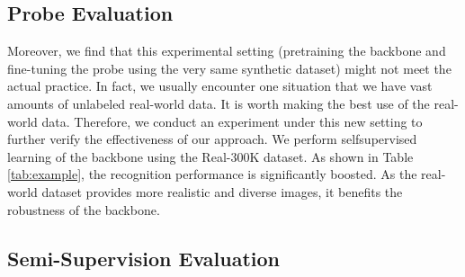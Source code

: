 \documentclass{article}
\begin{document}
\begin{multicols}{2}
\subsection{ Probe Evaluation}
Moreover, we find that this experimental setting (pretraining the backbone and fine-tuning the probe using the
very same synthetic dataset) might not meet the actual practice. In fact, we usually encounter one situation that we
have vast amounts of unlabeled real-world data. It is worth
making the best use of the real-world data. Therefore, we
conduct an experiment under this new setting to further verify the effectiveness of our approach. We perform selfsupervised learning of the backbone using the Real-300K
dataset. As shown in Table \ref{tab:example}, the recognition performance
is significantly boosted. As the real-world dataset provides
more realistic and diverse images, it benefits the robustness
of the backbone.
\begin{table}[H]
  \centering
  \caption{Probe evaluation. We report the word accuracy (Acc., %
and word-level accuracy up to one edit distance (E.D. 1, %
real training data provides more robust representations.}
  \label{tab:example} 
\end{table}
\subsection{ Semi-Supervision Evaluation}

\end{multicols}
\end{document}
